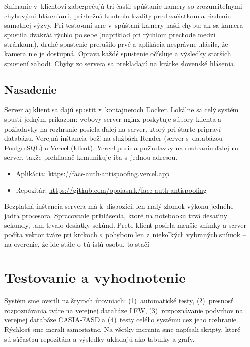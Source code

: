 \documentclass[12pt,a4paper,oneside]{report}
\begin{document}
Snímanie v~klientovi zabezpečujú tri časti: spúšťanie kamery so zrozumiteľnými
chybovými hláseniami, priebežná kontrola kvality pred začiatkom a riadenie samotnej
výzvy. Pri testovaní sme v~spúšťaní kamery našli chybu: ak sa kamera spustila dvakrát
rýchlo po sebe (napríklad pri rýchlom prechode medzi stránkami), druhé spustenie
prerušilo prvé a aplikácia nesprávne hlásila, že kamera nie je dostupná. Oprava každé
spustenie očísluje a výsledky starších spustení zahodí. Chyby zo servera sa prekladajú
na krátke slovenské hlásenia.

\section{Nasadenie}

Server aj klient sa dajú spustiť v~kontajneroch Docker. Lokálne sa celý systém spustí
jedným príkazom: webový server nginx poskytuje súbory klienta
a požiadavky na rozhranie posiela ďalej na server, ktorý pri štarte pripraví databázu.
Verejná inštancia beží na službách Render (server s~databázou PostgreSQL) a Vercel
(klient). Vercel posiela požiadavky na rozhranie ďalej na server, takže prehliadač
komunikuje iba s~jednou adresou.

\begin{itemize}
  \item Aplikácia: \url{https://face-auth-antispoofing.vercel.app}
  \item Repozitár: \url{https://github.com/opoiasnik/face-auth-antispoofing}
\end{itemize}

Bezplatná inštancia servera má k~dispozícii len malý zlomok výkonu jedného jadra
procesora. Spracovanie prihlásenia, ktoré na notebooku trvá desatiny sekundy, tam trvalo
desiatky sekúnd. Preto klient posiela menšie snímky a server počíta vektor tváre pri
krokoch s~pohybom len z~niekoľkých vybraných snímok -- na overenie, že ide stále o~tú
istú osobu, to stačí.

\chapter{Testovanie a vyhodnotenie}
\label{ch:testovanie}

Systém sme overili na štyroch úrovniach: (1)~automatické testy, (2)~presnosť
rozpoznávania tváre na verejnej databáze LFW, (3)~rozpoznávanie podvrhov na verejnej
databáze CASIA-FASD a (4)~testy celého systému cez jeho rozhranie. Rýchlosť sme merali
samostatne. Na všetky merania sme napísali skripty, ktoré sú súčasťou repozitára
a výsledky ukladajú ako tabuľky a grafy.
\end{document}
